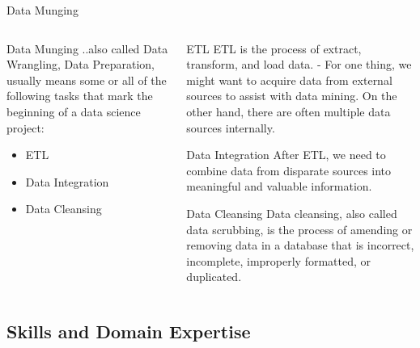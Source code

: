\documentclass[10pt]{beamer}
\begin{document}
   \begin{frame}{Data Munging}
     \begin{columns}
       \begin{column}[T]{0.48\textwidth}
         \begin{block}{Data Munging}
           ..also called Data Wrangling, Data Preparation, usually means some or all of the following tasks that mark the beginning of a data science project:
           \begin{itemize}
             \item<1-> ETL
             \item<2-> Data Integration
             \item<3-> Data Cleansing
           \end{itemize}
         \end{block}
       \end{column}
       \begin{column}[T]{0.48\textwidth}
         \begin{overprint}
             \begin{alertblock}{ETL}
               ETL is the process of extract, transform, and load data. - For one thing, we might want to acquire data from external sources to assist with data mining. On the other hand, there are often multiple data sources internally.
             \end{alertblock}
             \begin{alertblock}{Data Integration}
               After ETL, we need to combine data from disparate sources into meaningful and valuable information.
             \end{alertblock}
             \begin{alertblock}{Data Cleansing}
               Data cleansing, also called data scrubbing, is the process of amending or removing data in a database that is incorrect, incomplete, improperly formatted, or duplicated.
             \end{alertblock}
         \end{overprint}
       \end{column}   
     \end{columns}
   \end{frame}

  \subsection{Skills and Domain Expertise}
\end{document}
